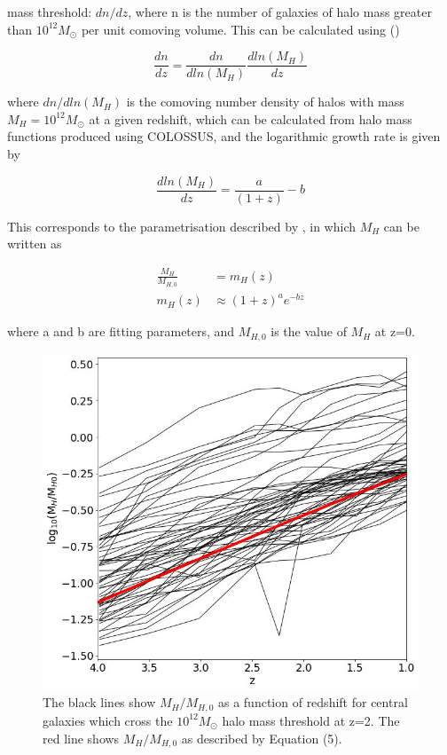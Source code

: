 \documentclass[12pt, twocolumn]{report}%
\begin{document}
mass threshold: $dn/dz$, where n is the number of galaxies of halo mass greater than $10^{12}M_\odot$ per unit comoving volume. This can be calculated using (\cite{Correa})

\begin{equation}
    \frac{dn}{dz}=\frac{dn}{dln(M_H)}\frac{dln(M_H)}{dz}
\end{equation}

\noindent where $dn/dln(M_H)$ is the comoving number density of halos with mass $M_H=10^{12}M_\odot$ at a given redshift, which can be calculated from halo mass functions produced using COLOSSUS, and the logarithmic growth rate is given by

\begin{equation}
    \frac{dln(M_H)}{dz}=\frac{a}{(1+z)}-b
\end{equation}

\noindent This corresponds to the parametrisation described by \cite{Correa}, in which $M_H$ can be written as

\begin{align}
    \frac{M_H}{M_{H,0}}&=m_H(z) \nonumber \\
    m_H(z)&\approx(1+z)^ae^{-bz}
\end{align}

\noindent where a and b are fitting parameters, and $M_{H,0}$ is the value of $M_H$ at z=0. \cite{Correa}

\begin{figure}[H]
\centering
\includegraphics[width=\linewidth]{Plot_5.jpeg}
\caption{The black lines show $M_H/M_{H,0}$ as a function of redshift for central galaxies which cross the $10^{12}M_\odot$ halo mass threshold at z=2. The red line shows $M_H/M_{H,0}$ as described by Equation (5).}
\label{fig:5}
\end{figure}
\end{document}
